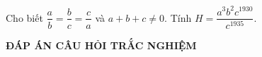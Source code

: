 \begin{ex}%
Cho biết $\dfrac{a}{b}=\dfrac{b}{c}=\dfrac{c}{a}$ và $a+b+c \ne 0$. Tính $H=\dfrac{a^3b^2c^{1930}}{c^{1935}}$.
\end{ex}		
		
	
	


	\begin{center}
		\textbf{ĐÁP ÁN CÂU HỎI TRẮC NGHIỆM}
	\end{center}
	\boxans
	